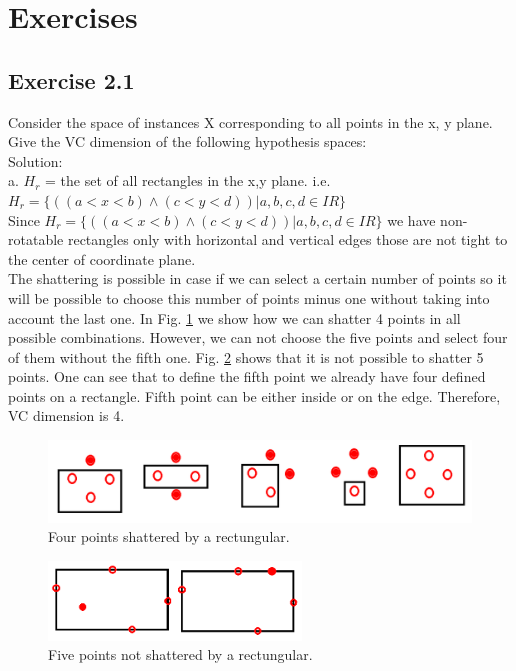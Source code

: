 \documentclass[a4paper, 12pt]{article}
\begin{document}
\section{Exercises}

\subsection*{Exercise 2.1}
Consider the space of instances X corresponding to all points in the x, y plane. Give the VC dimension of the following hypothesis spaces:\\

Solution:\\

a. $H_r$ = the set of all rectangles in the x,y plane. i.e. $H_r = \{((a < x < b) \wedge (c < y < d)) | a, b, c, d \in IR\}$\\

Since $H_r = \{((a < x < b) \wedge (c < y < d)) | a, b, c, d \in IR\}$ we have non-rotatable rectangles only with horizontal and vertical edges those are not tight to the center of coordinate plane. \\
The shattering is possible in case if we can select a certain number of points so it will be possible to choose this number of points minus one without taking into account the last one. In Fig. \ref{fig:RectangularPoints} we show how we can shatter 4 points in all possible combinations. However, we can not choose the five points and select four of them without the fifth one.  Fig. \ref{fig:Rectangular5Points} shows that it is not possible to shatter 5 points. One can see that to define the fifth point we already have four defined points on a rectangle. Fifth point can be either inside or on the edge. Therefore, VC dimension is 4. 

\begin{figure}[h]
  \centering
  \caption{Four points shattered by a rectungular.\label{fig:RectangularPoints}}
  \includegraphics[width=1.0\textwidth]{RectangularPoints}
\end{figure}

\begin{figure}[h]
  \centering
  \caption{Five points not shattered by a rectungular.\label{fig:Rectangular5Points}}
  \includegraphics[width=0.6\textwidth]{Rectangular5Points}
\end{figure}
\end{document}
